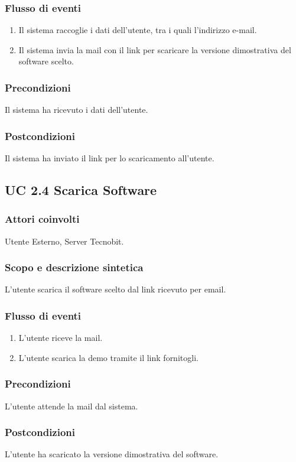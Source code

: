 \subsubsection*{Flusso di eventi}
\begin{enumerate}
\item Il sistema raccoglie i dati dell'utente, tra i quali l'indirizzo e-mail.
\item Il sistema invia la mail con il link per scaricare la versione dimostrativa del software scelto.
\end{enumerate}
\subsubsection*{Precondizioni} Il sistema ha ricevuto i dati dell'utente.
\subsubsection*{Postcondizioni} Il sistema ha inviato il link per lo scaricamento all'utente.

\subsection*{UC 2.4 Scarica Software}
\subsubsection*{Attori coinvolti} Utente Esterno, Server Tecnobit.
\subsubsection*{Scopo e descrizione sintetica}
L'utente scarica il software scelto dal link ricevuto per email.
\subsubsection*{Flusso di eventi}
\begin{enumerate}
\item L'utente riceve la mail.
\item L'utente scarica la demo tramite il link fornitogli.
\end{enumerate}
\subsubsection*{Precondizioni} L'utente attende la mail dal sistema.
\subsubsection*{Postcondizioni} L'utente ha scaricato la versione dimostrativa del software.

